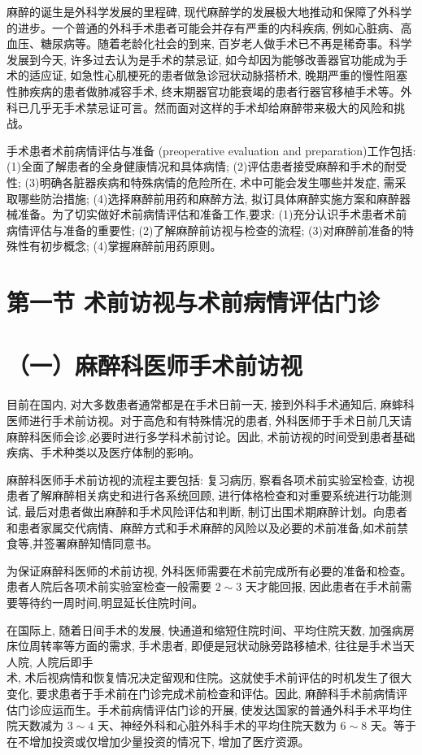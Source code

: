\documentclass[10pt]{article}
\begin{document}
麻醉的诞生是外科学发展的里程碑, 现代麻醉学的发展极大地推动和保障了外科学的进步。一个普通的外科手术患者可能会并存有严重的内科疾病, 例如心脏病、高血压、糖尿病等。随着老龄化社会的到来, 百岁老人做手术已不再是稀奇事。科学发展到今天, 许多过去认为是手术的禁忌证, 如今却因为能够改善器官功能成为手术的适应证, 如急性心肌梗死的患者做急诊冠状动脉搭桥术, 晚期严重的慢性阻塞性肺疾病的患者做肺减容手术, 终末期器官功能衰竭的患者行器官移植手术等。外科已几乎无手术禁忌证可言。然而面对这样的手术却给麻醉带来极大的风险和挑战。

手术患者术前病情评估与准备 (preoperative evaluation and preparation)工作包括: (1)全面了解患者的全身健康情况和具体病情; (2)评估患者接受麻醉和手术的耐受性; (3)明确各脏器疾病和特殊病情的危险所在, 术中可能会发生哪些并发症, 需采取哪些防治措施; (4)选择麻醉前用药和麻醉方法, 拟订具体麻醉实施方案和麻醉器械准备。为了切实做好术前病情评估和准备工作,要求: (1)充分认识手术患者术前病情评估与准备的重要性; (2)了解麻醉前访视与检查的流程; (3)对麻醉前准备的特殊性有初步概念; (4)掌握麻醉前用药原则。

\section*{第一节 术前访视与术前病情评估门诊}
\section*{（一）麻醉科医师手术前访视}
目前在国内, 对大多数患者通常都是在手术日前一天, 接到外科手术通知后, 麻蟀科医师进行手术前访视。对于高危和有特殊情况的患者, 外科医师于手术日前几天请麻醉科医师会诊,必要时进行多学科术前讨论。因此, 术前访视的时间受到患者基础疾病、手术种类以及医疗体制的影响。

麻醉科医师手术前访视的流程主要包括: 复习病历, 察看各项术前实验室检查, 访视患者了解麻醉相关病史和进行各系统回顾, 进行体格检查和对重要系统进行功能测试, 最后对患者做出麻醉和手术风险评估和判断, 制订出围术期麻醉计划。向患者和患者家属交代病情、麻醉方式和手术麻醉的风险以及必要的术前准备,如术前禁食等,并签署麻醉知情同意书。

为保证麻醉科医师的术前访视, 外科医师需要在术前完成所有必要的准备和检查。患者人院后各项术前实验室检查一般需要 $2 \sim 3$ 天才能回报, 因此患者在手术前需要等待约一周时间,明显延长住院时间。

在国际上, 随着日间手术的发展, 快通道和缩短住院时间、平均住院天数, 加强病房床位周转率等方面的需求, 手术患者, 即便是冠状动脉旁路移植术, 往往是手术当天人院, 人院后即手\\
术, 术后视病情和恢复情况决定留观和住院。这就使手术前评估的时机发生了很大变化, 要求患者于手术前在门诊完成术前检查和评估。因此, 麻醉科手术前病情评估门诊应运而生。手术前病情评估门诊的开展, 使发达国家的普通外科手术平均住院天数减为 $3 \sim 4$ 天、神经外科和心脏外科手术的平均住院天数为 $6 \sim 8$ 天。等于在不增加投资或仅增加少量投资的情况下, 增加了医疗资源。
\end{document}
